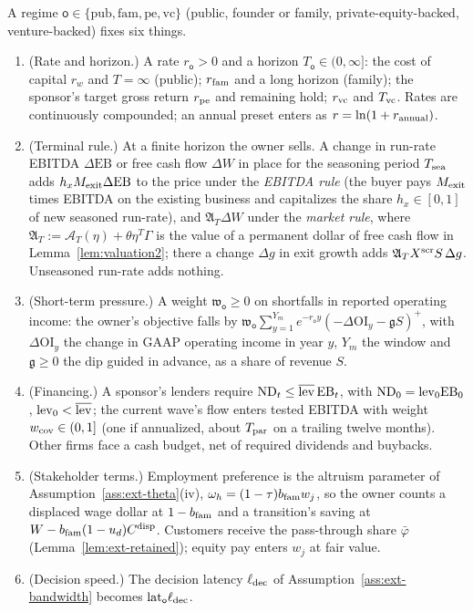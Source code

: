 \begin{assumption}\label{ass:reg-regime}
A regime $\mathsf o\in\{\mathrm{pub},\mathrm{fam},\mathrm{pe},\mathrm{vc}\}$ (public, founder or family, private-equity-backed, venture-backed) fixes six things.
\begin{enumerate}
\item[(i)] (Rate and horizon.) A rate $r_{\mathsf o}>0$ and a horizon $T_{\mathsf o}\in(0,\infty]$: the cost of capital $r_w$ and $T=\infty$ (public); $r_{\rm fam}$ and a long horizon (family); the sponsor's target gross return $r_{\rm pe}$ and remaining hold; $r_{\rm vc}$ and $T_{\rm vc}$. Rates are continuously compounded; an annual preset enters as $r=\ln(1+r_{\rm annual})$.
\item[(ii)] (Terminal rule.) At a finite horizon the owner sells. A change in run-rate EBITDA $\Delta\mathrm{EB}$ or free cash flow $\Delta W$ in place for the seasoning period $T_{\rm sea}$ adds $h_xM_{\rm exit}\Delta\mathrm{EB}$ to the price under the \emph{EBITDA rule} (the buyer pays $M_{\rm exit}$ times EBITDA on the existing business and capitalizes the share $h_x\in[0,1]$ of new seasoned run-rate), and $\mathfrak A_T\Delta W$ under the \emph{market rule}, where $\mathfrak A_T:=\mathcal A_T(\eta)+\theta\eta^T\Gamma$ is the value of a permanent dollar of free cash flow in Lemma~\ref{lem:valuation2}; there a change $\Delta g$ in exit growth adds $\mathfrak A_TX^{\rm scr}S\,\Delta g$. Unseasoned run-rate adds nothing.
\item[(iii)] (Short-term pressure.) A weight $\mathfrak w_{\mathsf o}\ge0$ on shortfalls in reported operating income: the owner's objective falls by $\mathfrak w_{\mathsf o}\sum_{y=1}^{Y_m}e^{-r_{\mathsf o}y}(-\Delta\mathrm{OI}_y-\mathfrak gS)^+$, with $\Delta\mathrm{OI}_y$ the change in GAAP operating income in year $y$, $Y_m$ the window and $\mathfrak g\ge0$ the dip guided in advance, as a share of revenue $S$.
\item[(iv)] (Financing.) A sponsor's lenders require $\mathrm{ND}_t\le\overline{\rm lev}\,\mathrm{EB}_t$, with $\mathrm{ND}_0={\rm lev}_0\mathrm{EB}_0$, ${\rm lev}_0<\overline{\rm lev}$; the current wave's flow enters tested EBITDA with weight $w_{\rm cov}\in(0,1]$ (one if annualized, about $T_{\rm par}$ on a trailing twelve months). Other firms face a cash budget, net of required dividends and buybacks.
\item[(v)] (Stakeholder terms.) Employment preference is the altruism parameter of Assumption~\ref{ass:ext-theta}(iv), $\omega_h=(1-\tau)b_{\rm fam}w_j$, so the owner counts a displaced wage dollar at $1-b_{\rm fam}$ and a transition's saving at $W-b_{\rm fam}(1-u_d)C^{\rm disp}$. Customers receive the pass-through share $\bar\varphi$ (Lemma~\ref{lem:ext-retained}); equity pay enters $w_j$ at fair value.
\item[(vi)] (Decision speed.) The decision latency $\ell_{\rm dec}$ of Assumption~\ref{ass:ext-bandwidth} becomes ${\rm lat}_{\mathsf o}\ell_{\rm dec}$.
\end{enumerate}
\end{assumption}

